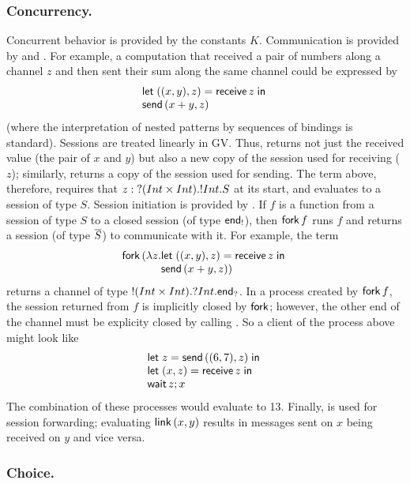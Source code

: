 \documentclass[oribibl,orivec,envcountsame]{llncs}
\begin{document}
\subsubsection{Concurrency.}

Concurrent behavior is provided by the constants $K$.  Communication is provided by 
and .  For example, a computation that received a pair of numbers along a channel
$z$ and then sent their sum along the same channel could be expressed by
%
\[\bl
  \gvlet{((x, y), z)}{\gvreceive{z}}{} \\
  \gvsend{(x + y,z)}
\el\]
%
(where the interpretation of nested patterns by sequences of bindings is standard).  Sessions are
treated linearly in GV.  Thus,  returns not just the received value (the pair of
$x$ and $y$) but also a new copy of the session used for receiving ($z$); similarly, 
returns a copy of the session used for sending.  The term above, therefore, requires that $z :
{?(Int \times Int).{!Int.S}}$ at its start, and evaluates to a session of type $S$. Session
initiation is provided by .  If $f$ is a function from a session of type $S$ to a
closed session (of type $\mathsf{end}_!$), then $\mathsf{fork} \, f$ runs $f$ and returns a session (of
type $\overline{S}$) to communicate with it.  For example, the term
%
\[\bl
 \gvconst{fork} \app (\lambda z.
 \bl
   \gvlet{((x, y), z)}{\gvreceive{z}}{} \\
   \gvsend{(x + y,z)}) \el
\el\]
%
returns a channel of type ${!(Int \times Int).{?Int.\mathsf{end}_?}}$.  In a process created by
$\mathsf{fork} \, f$, the session returned from $f$ is implicitly closed by $\mathsf{fork}$;
however, the other end of the channel must be explicity closed by calling .  So a
client of the process above might look like
%
\[\bl
  \gvlet{z}{\gvsend{((6,7),z)}}{} \\
  \gvlet{(x,z)}{\gvreceive{z}}{} \\
  \gvletunit{\gvconst{wait}\app z}{x}
\el\]
%
The combination of these processes would evaluate to 13.  Finally,  is used for
session forwarding; evaluating $\mathsf{link} \, (x, y)$ results in messages sent on $x$ being
received on $y$ and vice versa.

\subsubsection{Choice.}
\end{document}
